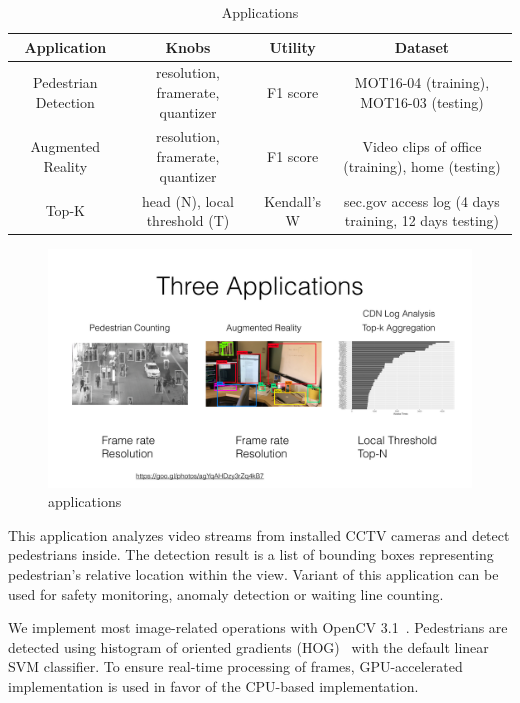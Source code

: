 \begin{table}
  \small
  \centering
  \begin{tabular}{|c|c|c|c|}
    \hline
    Application & Knobs & Utility & Dataset \\
    \hline
    Pedestrian Detection & resolution, framerate, quantizer
                        & F1 score & MOT16-04 (training), MOT16-03 (testing) \\
    \hline
    Augmented Reality & resolution, framerate, quantizer
                        & F1 score & Video clips of office (training), home (testing) \\
    \hline
    Top-K & head (N), local threshold (T) & Kendall's W & sec.gov access log
                                                          (4 days training, 12 days testing)  \\
    \hline
  \end{tabular}
  \caption{\sysname{} Applications}
  \label{tab:apps}
\end{table}

\begin{figure}
  \centering
  \includegraphics[width=.95\textwidth]{figures/apps.pdf}
  \caption{\sysname{} applications}
  \label{fig:apps}
\end{figure}

 This application analyzes video streams from
installed CCTV cameras and detect pedestrians inside. The detection result is a
list of bounding boxes representing pedestrian's relative location within the
view. Variant of this application can be used for safety monitoring, anomaly
detection or waiting line counting.

We implement most image-related operations with OpenCV
3.1~\cite{opencvlibrary}. Pedestrians are detected using histogram of oriented
gradients (HOG)~\cite{dalal2005histograms} with the default linear SVM
classifier. To ensure real-time processing of frames, GPU-accelerated
implementation is used in favor of the CPU-based implementation.

